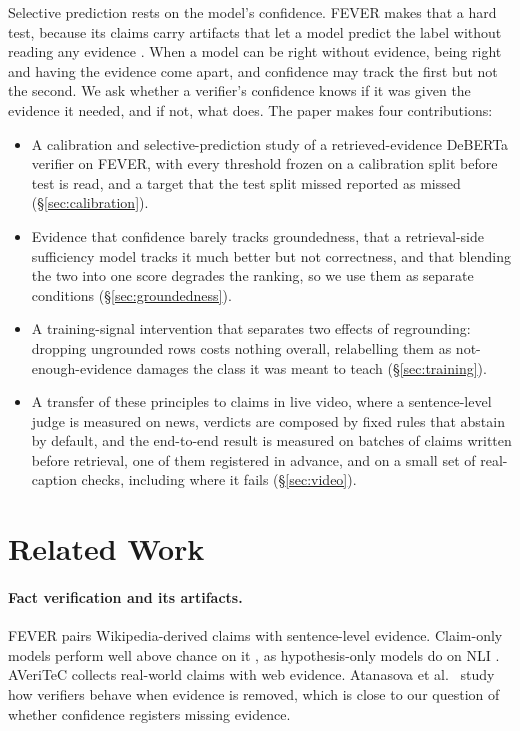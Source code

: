 \documentclass[11pt]{article}
\begin{document}
Selective prediction rests on the model's confidence. FEVER makes that a hard test, because its claims
carry artifacts that let a model predict the label without reading any evidence
\citep{schuster2019debiasing}. When a model can be right without evidence, being right and having the
evidence come apart, and confidence may track the first but not the second. We ask whether a verifier's
confidence knows if it was given the evidence it needed, and if not, what does. The paper makes four
contributions:
\begin{itemize}
  \item A calibration and selective-prediction study of a retrieved-evidence DeBERTa verifier on FEVER,
        with every threshold frozen on a calibration split before test is read, and a target that the
        test split missed reported as missed (\S\ref{sec:calibration}).
  \item Evidence that confidence barely tracks groundedness, that a retrieval-side sufficiency model
        tracks it much better but not correctness, and that blending the two into one score degrades the
        ranking, so we use them as separate conditions (\S\ref{sec:groundedness}).
  \item A training-signal intervention that separates two effects of regrounding: dropping ungrounded
        rows costs nothing overall, relabelling them as not-enough-evidence damages the class it was meant
        to teach (\S\ref{sec:training}).
  \item A transfer of these principles to claims in live video, where a sentence-level judge is measured
        on news, verdicts are composed by fixed rules that abstain by default, and the end-to-end result is
        measured on batches of claims written before retrieval, one of them registered in advance, and on a
        small set of real-caption checks, including where it fails (\S\ref{sec:video}).
\end{itemize}

\section{Related Work}

\paragraph{Fact verification and its artifacts.} FEVER \citep{thorne2018fever} pairs Wikipedia-derived
claims with sentence-level evidence. Claim-only models perform well above chance on it
\citep{schuster2019debiasing}, as hypothesis-only models do on NLI \citep{gururangan2018artifacts}.
AVeriTeC \citep{schlichtkrull2023averitec} collects real-world claims with web evidence. Atanasova et al.\
\citep{atanasova2022insufficient} study how verifiers behave when evidence is removed, which is close to
our question of whether confidence registers missing evidence.
\end{document}

